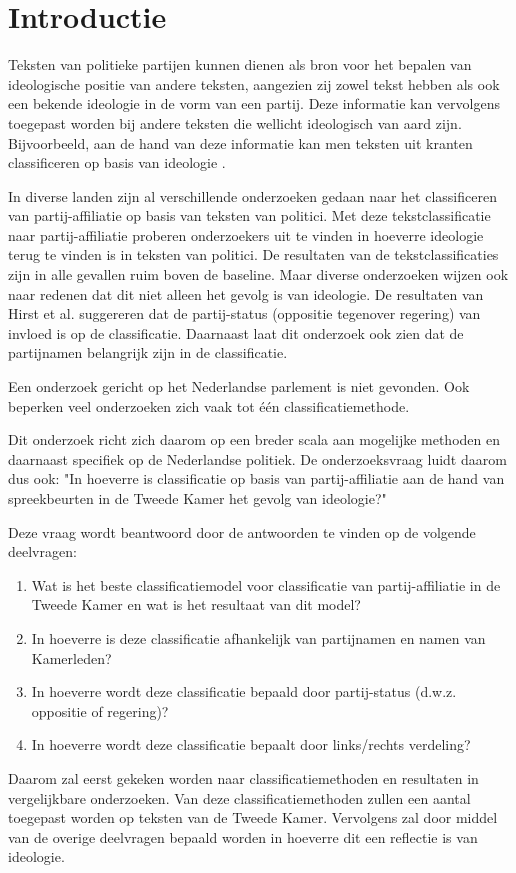 \section{Introductie}
\label{sec:intro}
Teksten van politieke partijen kunnen dienen als bron voor het bepalen van ideologische positie van andere teksten, aangezien zij zowel tekst hebben als ook een bekende ideologie in de vorm van een partij. Deze informatie kan vervolgens toegepast worden bij andere teksten die wellicht ideologisch van aard zijn. Bijvoorbeeld, aan de hand van deze informatie kan men teksten uit kranten classificeren op basis van ideologie \cite{DBLP:journals/corr/Biessmann16,Hirst_textto}.\par
In diverse landen zijn al verschillende onderzoeken gedaan naar het classificeren van partij-affiliatie op basis van teksten van politici\cite{Ferreira2016UsingTT,DBLP:journals/corr/Biessmann16}. Met deze tekstclassificatie naar partij-affiliatie proberen onderzoekers uit te vinden in hoeverre ideologie terug te vinden is in teksten van politici. De resultaten van de tekstclassificaties zijn in alle gevallen ruim boven de baseline. Maar diverse onderzoeken wijzen ook naar redenen dat dit niet alleen het gevolg is van ideologie.
De resultaten van Hirst et al. \cite{Hirst_textto} suggereren dat de partij-status (oppositie tegenover regering) van invloed is op de classificatie. Daarnaast laat dit onderzoek ook zien dat de partijnamen belangrijk zijn in de classificatie.\par
Een onderzoek gericht op het Nederlandse parlement is niet gevonden. Ook beperken veel onderzoeken zich vaak tot één classificatiemethode.\par
Dit onderzoek richt zich daarom op een breder scala aan mogelijke methoden en daarnaast specifiek op de Nederlandse politiek. De onderzoeksvraag luidt daarom dus ook: "In hoeverre is classificatie op basis van partij-affiliatie aan de hand van spreekbeurten in de Tweede Kamer het gevolg van ideologie?"\par
Deze vraag wordt beantwoord door de antwoorden te vinden op de volgende deelvragen:
\begin{enumerate}
    \item Wat is het beste classificatiemodel voor classificatie van partij-affiliatie in de Tweede Kamer en wat is het resultaat van dit model?
    \item In hoeverre is deze classificatie afhankelijk van partijnamen en namen van Kamerleden?
    \item In hoeverre wordt deze classificatie bepaald door partij-status (d.w.z. oppositie of regering)?
    \item In hoeverre wordt deze classificatie bepaalt door links/rechts verdeling?
\end{enumerate}
Daarom zal eerst gekeken worden naar classificatiemethoden en resultaten in vergelijkbare onderzoeken. Van deze classificatiemethoden zullen een aantal toegepast worden op teksten van de Tweede Kamer. Vervolgens zal door middel van de overige deelvragen bepaald worden in hoeverre dit een reflectie is van ideologie.


